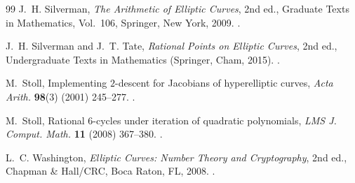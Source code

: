 \documentclass[11pt,a4paper]{amsart}
\theoremstyle{definition}
\theoremstyle{remark}
\numberwithin{equation}{section}
\begin{document}
\begin{thebibliography}{99}
J.~H. Silverman, \textit{The Arithmetic of Elliptic Curves}, 2nd ed.,
  Graduate Texts in Mathematics, Vol.~106, Springer, New York, 2009.
\newblock \href{https://doi.org/10.1007/978-0-387-09494-6}
  {}.

J.~H. Silverman and J.~T. Tate, \textit{Rational Points on Elliptic Curves},
  2nd ed., Undergraduate Texts in Mathematics (Springer, Cham, 2015).
\newblock \href{https://doi.org/10.1007/978-3-319-18588-0}
  {}.

M.~Stoll, Implementing $2$-descent for Jacobians of hyperelliptic curves,
  \textit{Acta Arith.} \textbf{98}(3) (2001) 245--277.
\newblock \href{https://doi.org/10.4064/aa98-3-4}
  {}.

M.~Stoll, Rational $6$-cycles under iteration of quadratic polynomials,
  \textit{LMS J. Comput. Math.} \textbf{11} (2008) 367--380.
\newblock \href{https://doi.org/10.1112/S1461157000000644}
  {}.

L.~C. Washington, \textit{Elliptic Curves: Number Theory and Cryptography},
  2nd ed., Chapman \& Hall/CRC, Boca Raton, FL, 2008.
\newblock \href{https://doi.org/10.1201/9781420071474}
  {}.

\end{thebibliography}
\end{document}
